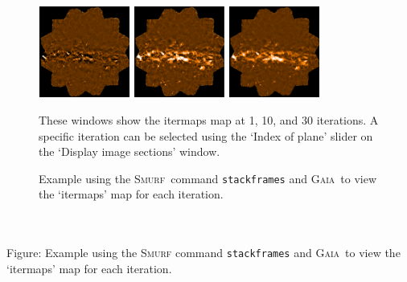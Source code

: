 \documentclass[twoside,11pt]{article}
\newcommand{\htmladdimg}[1]{}
\newenvironment{latexonly}{}{}
\newcommand{\xref}[3]{#1}
\renewcommand{\_}{\texttt{\symbol{95}}}
\newenvironment{fmpage}[1]{\begin{lrbox}{\fmbox}\begin{minipage}{#1}}{\end{minipage}\end{lrbox}\fbox{\usebox{\fmbox}}}
\newcommand{\gaia}{\xref{\textsc{Gaia}}{sun214}{}}
\newcommand{\smurf}{\xref{\textsc{Smurf}}{sun258}{}}
\begin{document}
\begin{latexonly}
\begin{figure}[ht!]
\begin{center}
\begin{fmpage}{0.95\linewidth}
\begin{minipage}[c]{0.65\linewidth}
\centering
\hspace{0.5mm}
\includegraphics[width=3cm, height=3cm]{sc21_iter1.eps}
\includegraphics[width=3cm, height=3cm]{sc21_iter2.eps}
\includegraphics[width=3cm, height=3cm]{sc21_iter31.eps}
\vspace{0.2cm}
\end{minipage}
\hspace{0.3cm}
\begin{minipage}[c]{0.29\linewidth}
These windows show the itermaps map at 1, 10, and 30 iterations. A
specific iteration can be selected using the `Index of plane' slider
on the `Display image sections' window.
\vspace{0.2cm}
\end{minipage}

\end{fmpage}
\end{center}
\caption{\small Example using the \smurf\ command \texttt{stackframes} and
\gaia\ to view the `itermaps' map for each iteration.}
\label{fig:stack}
\end{figure}
\end{latexonly}

\begin{htmlonly}
 \label{fig:stack} \htmladdimg{sc21_view_itermaps.png}
 \\ \\
 Figure: Example using the \textsc{Smurf} command \texttt{stackframes} and
 \gaia\ to view the `itermaps' map for each iteration.
\end{htmlonly}
\end{document}
